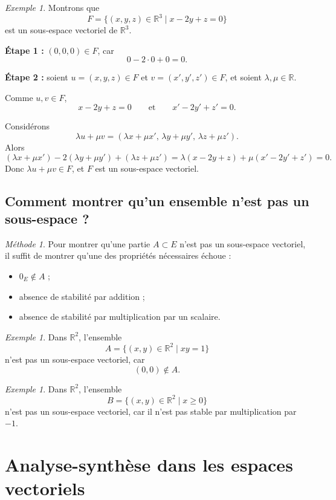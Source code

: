 \documentclass[11pt,a4paper]{article}
\theoremstyle{remark}
\newtheorem{exemple}[definition]{Exemple}
\newtheorem*{methode}{Méthode}
\newcommand{\R}{\mathbb{R}}
\begin{document}
\begin{exemple}
Montrons que
\[
F=\{(x,y,z)\in\R^3\mid x-2y+z=0\}
\]
est un sous-espace vectoriel de \(\R^3\).

\textbf{Étape 1 :} \((0,0,0)\in F\), car
\[
0-2\cdot 0+0=0.
\]

\textbf{Étape 2 :} soient \(u=(x,y,z)\in F\) et \(v=(x',y',z')\in F\), et soient \(\lambda,\mu\in\R\).

Comme \(u,v\in F\),
\[
x-2y+z=0
\qquad \text{et} \qquad
x'-2y'+z'=0.
\]

Considérons
\[
\lambda u+\mu v=(\lambda x+\mu x',\, \lambda y+\mu y',\, \lambda z+\mu z').
\]
Alors
\[
(\lambda x+\mu x')-2(\lambda y+\mu y')+(\lambda z+\mu z')
=
\lambda(x-2y+z)+\mu(x'-2y'+z')=0.
\]
Donc \(\lambda u+\mu v\in F\), et \(F\) est un sous-espace vectoriel.
\end{exemple}

\subsection{Comment montrer qu’un ensemble n’est pas un sous-espace ?}

\begin{methode}
Pour montrer qu’une partie \(A\subset E\) n’est pas un sous-espace vectoriel, il suffit de montrer qu’une des propriétés nécessaires échoue :
\begin{itemize}
    \item \(0_E\notin A\) ;
    \item absence de stabilité par addition ;
    \item absence de stabilité par multiplication par un scalaire.
\end{itemize}
\end{methode}

\begin{exemple}
Dans \(\R^2\), l’ensemble
\[
A=\{(x,y)\in\R^2\mid xy=1\}
\]
n’est pas un sous-espace vectoriel, car
\[
(0,0)\notin A.
\]
\end{exemple}

\begin{exemple}
Dans \(\R^2\), l’ensemble
\[
B=\{(x,y)\in\R^2\mid x\geq 0\}
\]
n’est pas un sous-espace vectoriel, car il n’est pas stable par multiplication par \(-1\).
\end{exemple}

\section{Analyse-synthèse dans les espaces vectoriels}
\end{document}
